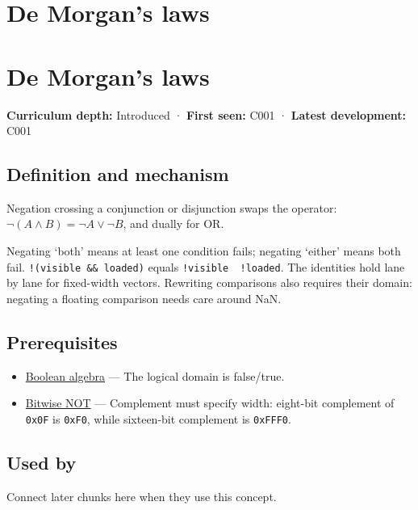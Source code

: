 \hypertarget{appendix-9079d3659da4}{}
\section*{De Morgan's laws}
\section{De Morgan's laws}\label{appendix-9079d3659da4-de-morgans-laws}

\textbf{Curriculum depth:} Introduced · \textbf{First seen:} C001 · \textbf{Latest development:} C001

\subsection{Definition and mechanism}\label{appendix-9079d3659da4-definition-and-mechanism}

Negation crossing a conjunction or disjunction swaps the operator: \(\neg(A\land B)=\neg A\lor\neg B\), and dually for OR.

Negating `both' means at least one condition fails; negating `either' means both fail. \texttt{!(visible\ \&\&\ loaded)} equals \texttt{!visible\ \textbar{}\textbar{}\ !loaded}. The identities hold lane by lane for fixed-width vectors. Rewriting comparisons also requires their domain: negating a floating comparison needs care around NaN.

\subsection{Prerequisites}\label{appendix-9079d3659da4-prerequisites}

\begin{itemize}
\tightlist
\item
  \hyperref[appendix-24475e1596a8]{Boolean algebra} --- The logical domain is false/true.
\item
  \hyperref[appendix-8f38927cfc54]{Bitwise NOT} --- Complement must specify width: eight-bit complement of \texttt{0x0F} is \texttt{0xF0}, while sixteen-bit complement is \texttt{0xFFF0}.
\end{itemize}

\subsection{Used by}\label{appendix-9079d3659da4-used-by}

Connect later chunks here when they use this concept.

